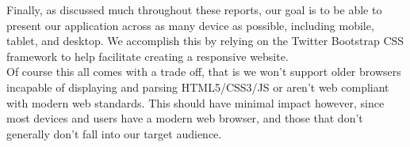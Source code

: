 Finally, as discussed much throughout these reports, our goal is to be able to
present our application across as many device as possible, including mobile,
tablet, and desktop.  We accomplish this by relying on the Twitter
Bootstrap\cite{wiki:boot} CSS framework to help facilitate creating a responsive
website.\\

Of course this all comes with a trade off, that is we won't support older
browsers incapable of displaying and parsing HTML5/CSS3/JS or aren't web
compliant with modern web standards.  This should have minimal impact however,
since most devices and users have a modern web browser, and those that don't
generally don't fall into our target audience.\\
